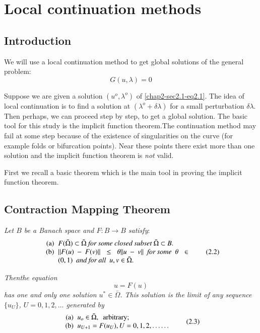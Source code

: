\chapter{Local continuation methods}\label{chap2} %

\section{Introduction}\label{chap2-sec2.1}\pageoriginale
  
We will use a local continuation method to get global solutions of the
general problem:  
\begin{equation*}
G(u, \lambda) = 0 \tag{2.1}\label{chap2-sec2.1-eq2.1}
\end{equation*}

Suppose we are given a solution $(u^{o}, \lambda^{o})$ of
\eqref{chap2-sec2.1-eq2.1}. The 
idea of local continuation is to find a solution at
$(\lambda^{o}+\delta \lambda)$ for a small perturbation $\delta
\lambda$. Then perhaps, we can proceed step by step, to get a global
solution. The basic tool for this study is the implicit function
theorem.The continuation method may fail at some step because of the
existence of singularities on the curve (for example folds or
bifurcation points). Near these points there exist more than one
solution and the implicit function theorem is {\em not} valid.  

First we recall a basic theorem which is the main tool in proving the
implicit function theorem.  

\section{Contraction Mapping Theorem}\label{chap2-sec2.2} 

\textit{Let $B$ be a Banach space and $F : B \to B$
satisfy}:  
\begin{equation*}
  \begin{array}{r@{\;\;}>{$}p{6.5cm}<{$}}
\text{(a)} &  F (\bar{\Omega}) \subset \bar{\Omega} \textit{ for some
  closed subset } 
\bar{\Omega} \subset B.\\ 
\text{(b)} & \| F (u)-F(v) \| \le \theta \| u-v\| \textit{ \ for
  some \ }\theta \in (0,1) \textit{ \ and for all \ } u, v \in \bar{\Omega}. 
\end{array}\tag{2.2}\label{chap2-sec2.2-eq2.2} 
\end{equation*}

\textit{Then\pageoriginale the equation
$$
u = F(u)
$$
has one and only one solution  $u^{*} \in \bar{\Omega}$. 
This solution is the limit of any sequence $\{u_{U}\}$, $U = 0, 
1,2,\ldots$ generated by} 
\begin{equation*}
\begin{array}{r@{\;\;}l}
\text{(a)} & u_{o} \in \bar{\Omega}, \text{ \ arbitrary;}\\  
\text{(b)} & u_{U+1} = F(u_{U}), U = 0,1,2, \ldots \ldots
\end{array}
\tag{2.3} 
\label{chap2-sec2.2-eq2.3} 
\end{equation*}

